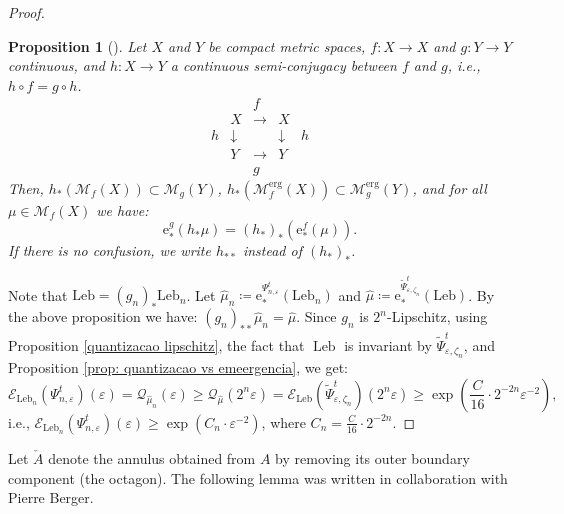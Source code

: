 \documentclass[11pt,reqno]{amsart}
\theoremstyle{plain}
\newtheorem{propsn}[theorem]{Proposition}
\theoremstyle{definition}
\theoremstyle{remark}
\theoremstyle{plain}
\numberwithin{equation}{section}
\newcommand{\Leb}{\operatorname{Leb}}
\newcommand{\eps}{\varepsilon}
\begin{document}
\begin{proof}
\begin{propsn}[{\cite[Lemma 3.11]{bergerbochi}}]
	Let $X$ and $Y$ be compact metric spaces, $f\colon X\to X$ and $g\colon Y\to Y$ continuous, and $h\colon X\to Y$ a continuous semi-conjugacy between $f$ and $g$, i.e., $h\circ f=g\circ h$. 
	\[
	\begin{array} {rcccl}
		& &f& &\\
		& X  &\to & X &\\
		h&\downarrow &  &\downarrow &h\\
		& Y  &\to & Y &\\
		& &g& &
	\end{array} 
	\]
	Then, $h_{\ast}(\mathcal{M}_{f}(X))\subset \mathcal{M}_{g}(Y)$, $h_{\ast}(\mathcal{M}_{f}^{\mathrm{erg}}(X))\subset \mathcal{M}_{g}^{\mathrm{erg}}(Y)$, and for all $\mu \in \mathcal{M}_{f}(X)$ we have: $$\mathrm{e}_{\ast}^{g}(h_{\ast}\mu)=(h_{\ast})_{\ast}(\mathrm{e}_{\ast}^{f}(\mu)).$$ If there is no confusion, we write $h_{\ast\ast}$ instead of $(h_{\ast})_{\ast}$. 
\end{propsn}



Note that $\mathrm{Leb}=(g_{n})_{\ast}\mathrm{Leb}_{n}$. Let $\widehat{\mu}_{n}\coloneqq\mathrm{e}^{\Psi^{t}_{n,\eps}}_{\ast}(\mathrm{Leb}_{n})$ and $\widehat{\mu}\coloneqq \mathrm{e}^{\tilde \Psi^{t}_{\eps,\zeta_n}}_{\ast}(\mathrm{Leb})$. By the above proposition we have: $(g_{n})_{\ast\ast}\widehat{\mu}_{n}=\widehat{\mu}$. Since $g_{n}$ is $2^{n}$-Lipschitz, using Proposition \ref{quantizacao lipschitz}, the fact that $\Leb$ is invariant by $\tilde \Psi_{\eps,\zeta_n}^{t}$, and Proposition \ref{prop: quantizacao vs emeergencia}, we get: $$
\mathcal{E}_{\mathrm{Leb}_{n}}(\Psi^{t}_{n,\eps})(\eps)=\mathcal{Q}_{\widehat{\mu}_{n}}(\eps) \geq \mathcal{Q}_{\widehat{\mu}}(2^{n}\eps)=\mathcal{E}_{\mathrm{Leb}}(\tilde \Psi^{t}_{\eps,\zeta_n})(2^{n}\eps)\geq \exp\left(\frac{C}{16}\cdot 2^{-2n}\eps^{-2}\right),$$ 
i.e., $\mathcal{E}_{\mathrm{Leb}_{n}}(\Psi^{t}_{n,\eps})(\eps)\geq \exp\left(C_{n}\cdot \eps^{-2}\right)$, where $C_{n}=\frac{C}{16}\cdot 2^{-2n}$.
\end{proof}



Let $\check{A}$ denote the annulus obtained from $A$ by removing its outer boundary component (the octagon). The following lemma was written in collaboration with Pierre Berger.
\end{document}
